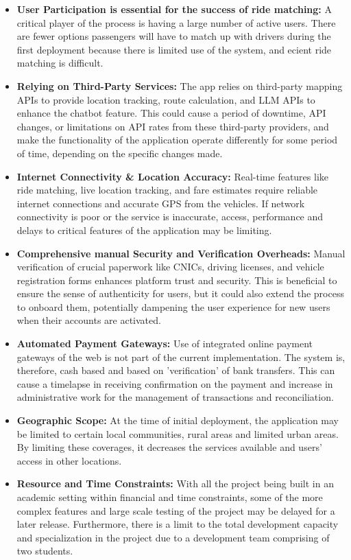 \begin{itemize}
    \item \textbf{User Participation is essential for the success of ride matching:} A critical player of the process is having a large number of active users. There are fewer options passengers will have to match up with drivers during the first deployment because there is limited use of the system, and ecient ride matching is difficult.

    \item \textbf{Relying on Third-Party Services:} The app relies on third-party mapping APIs to provide location tracking, route calculation, and LLM APIs to enhance the chatbot feature. This could cause a period of downtime, API changes, or limitations on API rates from these third-party providers, and make the functionality of the application operate differently for some period of time, depending on the specific changes made.

\item \textbf{Internet Connectivity \& Location Accuracy:} Real-time features like ride matching, live location tracking, and fare estimates require reliable internet connections and accurate GPS from the vehicles. If network connectivity is poor or the service is inaccurate, access, performance and delays to critical features of the application may be limiting.

\item \textbf{Comprehensive manual Security and Verification Overheads:} Manual verification of crucial paperwork like CNICs, driving licenses, and vehicle registration forms enhances platform trust and security. This is beneficial to ensure the sense of authenticity for users, but it could also extend the process to onboard them, potentially dampening the user experience for new users when their accounts are activated.

\item \textbf{Automated Payment Gateways:} Use of integrated online payment gateways of the web is not part of the current implementation. The system is, therefore, cash based and based on 'verification' of bank transfers. This can cause a timelapse in receiving confirmation on the payment and increase in administrative work for the management of transactions and reconciliation.

\item \textbf{Geographic Scope:} At the time of initial deployment, the application may be limited to certain local communities, rural areas and limited urban areas. By limiting these coverages, it decreases the services available and users' access in other locations.

\item \textbf{Resource and Time Constraints:} With all the project being built in an academic setting within financial and time constraints, some of the more complex features and large scale testing of the project may be delayed for a later release. Furthermore, there is a limit to the total development capacity and specialization in the project due to a development team comprising of two students.
\end{itemize}

